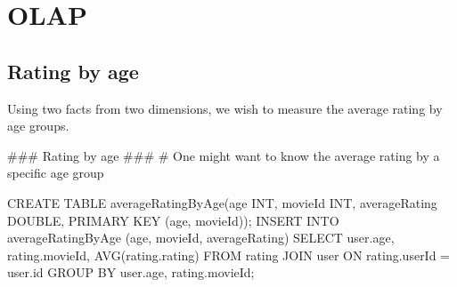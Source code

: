 \section{OLAP}
\subsection{Rating by age}
Using two facts from two dimensions, we wish to measure the average rating by
age groups.\\
\begin{spverbatim}
### Rating by age ###
# One might want to know the average rating by a specific age group

CREATE TABLE averageRatingByAge(age INT, movieId INT, averageRating DOUBLE,
PRIMARY KEY (age, movieId));
INSERT INTO averageRatingByAge (age, movieId, averageRating) SELECT user.age,
rating.movieId, AVG(rating.rating) FROM rating JOIN user ON rating.userId =
user.id GROUP BY user.age, rating.movieId;
\end{spverbatim}
\newpage

